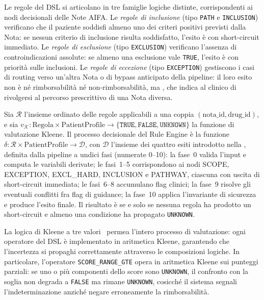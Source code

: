 Le regole del DSL si articolano in tre famiglie logiche distinte, corrispondenti
ai nodi decisionali delle Note AIFA.
Le \emph{regole di inclusione} (tipo \texttt{PATH} e \texttt{INCLUSION})
verificano che il paziente soddisfi almeno uno dei criteri positivi previsti
dalla Nota: se nessun criterio di inclusione risulta soddisfatto,
l'esito è  con short-circuit immediato.
Le \emph{regole di esclusione} (tipo \texttt{EXCLUSION}) verificano
l'assenza di controindicazioni assolute: se almeno una esclusione vale
\texttt{TRUE}, l'esito è  con priorità
sulle inclusioni.
Le \emph{regole di eccezione} (tipo \texttt{EXCEPTION}) gestiscono
i casi di routing verso un'altra Nota o di bypass anticipato della pipeline:
il loro esito non è né rimborsabilità né non-rimborsabilità, ma
, che indica al clinico di rivolgersi al percorso
prescrittivo di una Nota diversa.

\begin{definition}
\label{def:decisione}
Sia $\mathcal{R}$ l'insieme ordinato delle regole applicabili a una coppia
$(\text{nota\_id}, \text{drug\_id})$, e sia
$v_\mathcal{K} \colon \text{Regola} \times \text{PatientProfile}
\to \{\texttt{TRUE}, \texttt{FALSE}, \texttt{UNKNOWN}\}$
la funzione di valutazione Kleene.
Il processo decisionale del Rule Engine è la funzione
$\delta \colon \mathcal{R} \times \text{PatientProfile} \to \mathcal{D}$,
con $\mathcal{D}$ l'insieme dei quattro esiti introdotto nella
,
definita dalla pipeline a undici fasi (numerate 0--10): la fase~0 valida
l'input e computa le variabili derivate; le fasi~1--5 corrispondono ai nodi
SCOPE, EXCEPTION, EXCL\_HARD, INCLUSION e PATHWAY, ciascuna con uscita
di short-circuit immediata; le fasi~6--8 accumulano flag clinici;
la fase~9 risolve gli eventuali conflitti fra flag di guidance;
la fase~10 applica l'invariante di sicurezza e produce l'esito finale.
Il risultato è  se e solo se nessuna
regola ha prodotto un short-circuit e almeno una condizione ha
propagato \texttt{UNKNOWN}.
\end{definition}

La logica di Kleene a tre valori~\cite{kleene1952introduction} permea l'intero
processo di valutazione: ogni operatore del DSL è implementato in aritmetica
Kleene, garantendo che l'incertezza si propaghi correttamente attraverso
le composizioni logiche.
In particolare, l'operatore \texttt{SCORE\_RANGE\_GTE} opera in aritmetica
Kleene sui punteggi parziali: se uno o più componenti dello score sono
\texttt{UNKNOWN}, il confronto con la soglia non degrada a \texttt{FALSE}
ma rimane \texttt{UNKNOWN}, cosicché il sistema segnali l'indeterminazione
anziché negare erroneamente la rimborsabilità.

